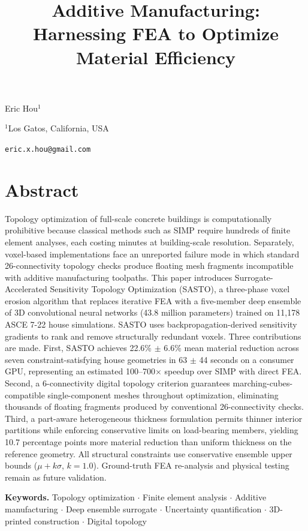 \documentclass[11pt]{article}
\title{Additive Manufacturing: Harnessing FEA to Optimize Material Efficiency}
\date{}
\makeatletter
\theoremstyle{plain}
\theoremstyle{definition}
\theoremstyle{remark}
\renewcommand{\maketitle}{
\begin{center}
{\fontsize{18}{22}\selectfont\bfseries \@title \par}
\vspace{1.2em}

{\large Eric Hou$^{1}$\par}
\vspace{0.3em}

{\normalsize $^{1}$Los Gatos, California, USA\par}
{\normalsize \texttt{eric.x.hou@gmail.com}\par}

\vspace{1.2em}

\end{center}
\vspace{1.8em}
}
\makeatother
\begin{document}
\maketitle

\section*{Abstract}

Topology optimization of full-scale concrete buildings is computationally prohibitive because classical methods such as SIMP require hundreds of finite element analyses, each costing minutes at building-scale resolution. Separately, voxel-based implementations face an unreported failure mode in which standard 26-connectivity topology checks produce floating mesh fragments incompatible with additive manufacturing toolpaths. This paper introduces Surrogate-Accelerated Sensitivity Topology Optimization (SASTO), a three-phase voxel erosion algorithm that replaces iterative FEA with a five-member deep ensemble of 3D convolutional neural networks (43.8 million parameters) trained on 11,178 ASCE 7-22 house simulations. SASTO uses backpropagation-derived sensitivity gradients to rank and remove structurally redundant voxels. Three contributions are made. First, SASTO achieves 22.6\% $\pm$ 6.6\% mean material reduction across seven constraint-satisfying house geometries in 63 $\pm$ 44 seconds on a consumer GPU, representing an estimated 100--700$\times$ speedup over SIMP with direct FEA. Second, a 6-connectivity digital topology criterion guarantees marching-cubes-compatible single-component meshes throughout optimization, eliminating thousands of floating fragments produced by conventional 26-connectivity checks. Third, a part-aware heterogeneous thickness formulation permits thinner interior partitions while enforcing conservative limits on load-bearing members, yielding 10.7 percentage points more material reduction than uniform thickness on the reference geometry. All structural constraints use conservative ensemble upper bounds ($\mu + k\sigma$, $k = 1.0$). Ground-truth FEA re-analysis and physical testing remain as future validation.

\vspace{0.9em}

\noindent\textbf{Keywords.}
Topology optimization $\cdot$ Finite element analysis $\cdot$ Additive manufacturing $\cdot$ Deep ensemble surrogate $\cdot$ Uncertainty quantification $\cdot$ 3D-printed construction $\cdot$ Digital topology
\end{document}
